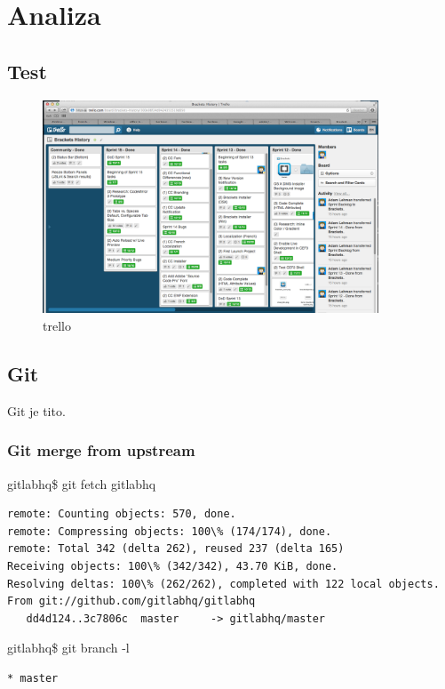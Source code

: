 \documentclass[times, utf8, seminar]{fit}
\begin{document}
\chapter{Analiza}
\vspace*{-0.7cm}

\section{Test}

\begin{figure}[H]
\centering
\includegraphics[width=10cm]{img/brackets_trello_sprint_history.png}
\caption{trello}
\end{figure}

\section{Git}

Git je tito.

\subsection{Git merge from upstream}

gitlabhq\$ git fetch gitlabhq

\begin{lstlisting}
remote: Counting objects: 570, done.
remote: Compressing objects: 100\% (174/174), done.
remote: Total 342 (delta 262), reused 237 (delta 165)
Receiving objects: 100\% (342/342), 43.70 KiB, done.
Resolving deltas: 100\% (262/262), completed with 122 local objects.
From git://github.com/gitlabhq/gitlabhq
   dd4d124..3c7806c  master     -> gitlabhq/master
\end{lstlisting}


gitlabhq\$ git branch -l

\begin{lstlisting}
* master
\end{lstlisting}
\end{document}
